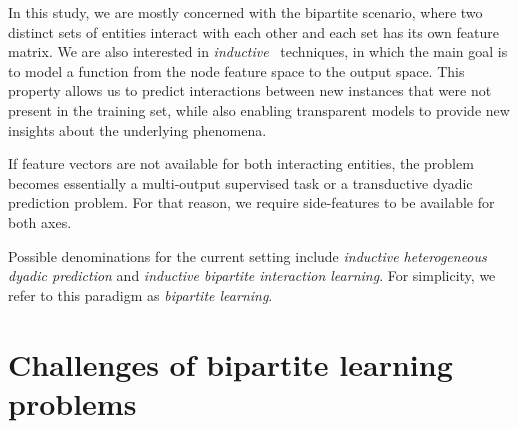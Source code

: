 In this study, we are mostly concerned with the bipartite scenario, where two distinct sets of entities interact with each other and each set has its own feature matrix.
We are also interested in \emph{inductive}~\cite{chapelle2006semisupervised} techniques, in which the main goal is to model a function from the node feature space to the output space. This property allows us to predict interactions between new instances that were not present in the training set, while also enabling transparent models to provide new insights about the underlying phenomena.

If feature vectors are not available for both interacting entities, the problem becomes essentially a multi-output supervised task or a transductive dyadic prediction problem.
For that reason, we require side-features to be available for both axes.

Possible denominations for the current setting include \emph{inductive heterogeneous dyadic prediction} and \emph{inductive bipartite interaction learning}. For simplicity, we refer to this paradigm as \emph{bipartite learning}.







\section{Challenges of bipartite learning problems}
\label{sec:challenges}

